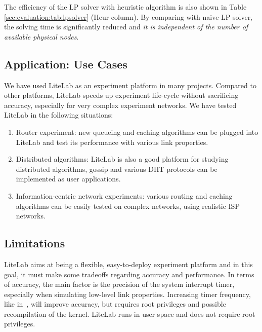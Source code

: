 \documentclass[conference]{IEEEtran}
\begin{document}
The efficiency of the LP solver with heuristic algorithm is also shown
in Table \ref{sec:evaluation:tab:lpsolver} (Heur column). By comparing
with naive LP solver, the solving time is significantly reduced and
\textit{it is independent of the number of available physical nodes}.










\subsection{Application: Use Cases}
\label{sec:evaluation:usecase}

We have used LiteLab as an experiment platform in many
projects. Compared to other platforms, LiteLab speeds up experiment
life-cycle without sacrificing accuracy, especially for very complex
experiment networks. We have tested LiteLab in the following
situations:

\begin{enumerate}

\item Router experiment: new queueing and caching algorithms can be
  plugged into LiteLab and test its performance with various link
  properties.

\item Distributed algorithms: LiteLab is also a good platform for
  studying distributed algorithms, gossip and various DHT protocols
  can be implemented as user applications.

\item Information-centric network experiments: various routing and
  caching algorithms can be easily tested on complex networks, using
  realistic ISP networks.
\end{enumerate}







\subsection{Limitations}
\label{sec:evaluation:limitation}

LiteLab aims at being a flexible, easy-to-deploy experiment platform
and in this goal, it must make some tradeoffs regarding accuracy and
performance. In terms of accuracy, the main factor is the precision of
the system interrupt timer, especially when simulating low-level link
properties. Increasing timer frequency, like in~\cite{White:osdi02},
will improve accuracy, but requires root privileges and possible
recompilation of the kernel. LiteLab runs in user space and does not
require root privileges.
\end{document}
